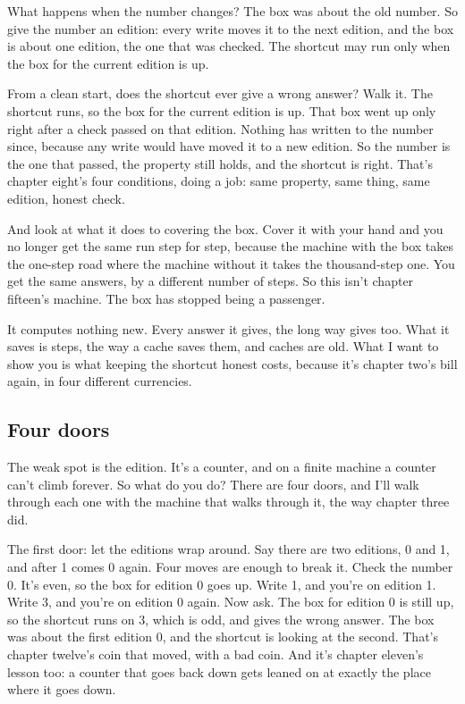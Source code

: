 \documentclass[11pt,twoside]{article}
\theoremstyle{thielethm}
\theoremstyle{thieledef}
\theoremstyle{thieledef}
\theoremstyle{thieledef}
\theoremstyle{thielethm}
\theoremstyle{thieleobs}
\theoremstyle{thielethm}
\begin{document}
What happens when the number changes? The box was about the old number. So give the number an edition: every write moves it to the next edition, and the box is about one edition, the one that was checked. The shortcut may run only when the box for the current edition is up.

From a clean start, does the shortcut ever give a wrong answer? Walk it. The shortcut runs, so the box for the current edition is up. That box went up only right after a check passed on that edition. Nothing has written to the number since, because any write would have moved it to a new edition. So the number is the one that passed, the property still holds, and the shortcut is right. That's chapter eight's four conditions, doing a job: same property, same thing, same edition, honest check.

And look at what it does to covering the box. Cover it with your hand and you no longer get the same run step for step, because the machine with the box takes the one-step road where the machine without it takes the thousand-step one. You get the same answers, by a different number of steps. So this isn't chapter fifteen's machine. The box has stopped being a passenger.

It computes nothing new. Every answer it gives, the long way gives too. What it saves is steps, the way a cache saves them, and caches are old. What I want to show you is what keeping the shortcut honest costs, because it's chapter two's bill again, in four different currencies.

\subsection{Four doors}

The weak spot is the edition. It's a counter, and on a finite machine a counter can't climb forever. So what do you do? There are four doors, and I'll walk through each one with the machine that walks through it, the way chapter three did.

The first door: let the editions wrap around. Say there are two editions, 0 and 1, and after 1 comes 0 again. Four moves are enough to break it. Check the number 0. It's even, so the box for edition 0 goes up. Write 1, and you're on edition 1. Write 3, and you're on edition 0 again. Now ask. The box for edition 0 is still up, so the shortcut runs on 3, which is odd, and gives the wrong answer. The box was about the first edition 0, and the shortcut is looking at the second. That's chapter twelve's coin that moved, with a bad coin. And it's chapter eleven's lesson too: a counter that goes back down gets leaned on at exactly the place where it goes down.
\end{document}
